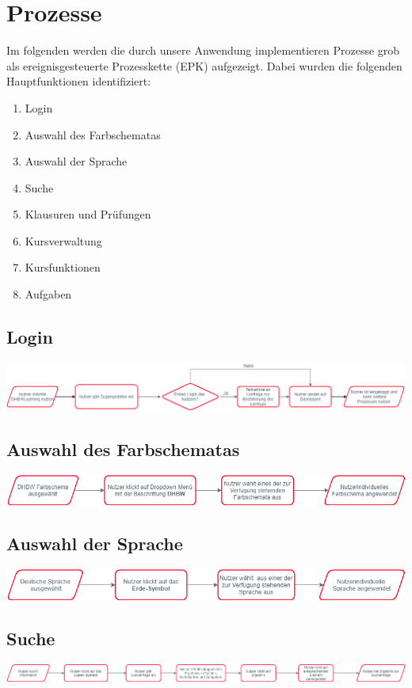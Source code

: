 
\chapter{Prozesse}
Im folgenden werden die durch unsere Anwendung implementieren Prozesse grob als ereignisgesteuerte Prozesskette (EPK) aufgezeigt. Dabei wurden die folgenden Hauptfunktionen identifiziert:
\begin{enumerate}
	\item Login
	\item Auswahl des Farbschematas
	\item Auswahl der Sprache
	\item Suche
	\item Klausuren und Prüfungen
	\item Kursverwaltung
	\item Kursfunktionen
	\item Aufgaben
\end{enumerate}

\section{Login}
	\includegraphics[width=\linewidth, keepaspectratio]{img/Prozesse/login}
\section{Auswahl des Farbschematas}
	\includegraphics[width=\linewidth, keepaspectratio]{img/Prozesse/color}
\section{Auswahl der Sprache}
	\includegraphics[width=\linewidth, keepaspectratio]{img/Prozesse/language}
\section{Suche}
	\includegraphics[width=\linewidth, keepaspectratio]{img/Prozesse/search}
